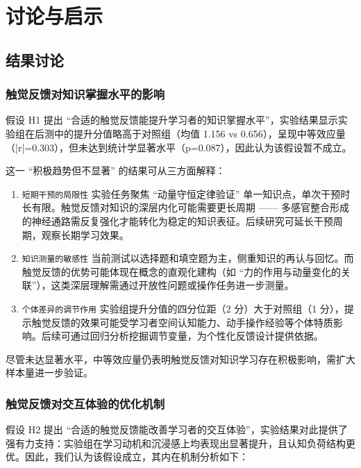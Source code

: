 \documentclass[runningheads]{llncs}
\begin{document}
\section{讨论与启示}
\subsection{结果讨论}
\subsubsection{触觉反馈对知识掌握水平的影响} 
假设 H1 提出 “合适的触觉反馈能提升学习者的知识掌握水平”，实验结果显示实验组在后测中的提升分值略高于对照组（均值 1.156 vs 0.656），呈现中等效应量（|r|=0.303），但未达到统计学显著水平（p=0.087），因此认为该假设暂不成立。

这一 “积极趋势但不显著” 的结果可从三方面解释：

\begin{enumerate}[label={\arabic*)}]
  \item \texttt{短期干预的局限性} 实验任务聚焦 “动量守恒定律验证” 单一知识点，单次干预时长有限。触觉反馈对知识的深层内化可能需要更长周期 —— 多感官整合形成的神经通路需反复强化才能转化为稳定的知识表征。后续研究可延长干预周期，观察长期学习效果。
  \item \texttt{知识测量的敏感性} 当前测试以选择题和填空题为主，侧重知识的再认与回忆。而触觉反馈的优势可能体现在概念的直观化建构（如 “力的作用与动量变化的关联”），这类深层理解需通过开放性问题或操作任务进一步测量。
  \item \texttt{个体差异的调节作用} 实验组提升分值的四分位距（2 分）大于对照组（1 分），提示触觉反馈的效果可能受学习者空间认知能力、动手操作经验等个体特质影响。后续可通过回归分析挖掘调节变量，为个性化反馈设计提供依据。
\end{enumerate}

尽管未达显著水平，中等效应量仍表明触觉反馈对知识学习存在积极影响，需扩大样本量进一步验证。

\subsubsection{触觉反馈对交互体验的优化机制}
假设 H2 提出 “合适的触觉反馈能改善学习者的交互体验”，实验结果对此提供了强有力支持：实验组在学习动机和沉浸感上均表现出显著提升，且认知负荷结构更优。因此，我们认为该假设成立，其内在机制分析如下：
\end{document}
